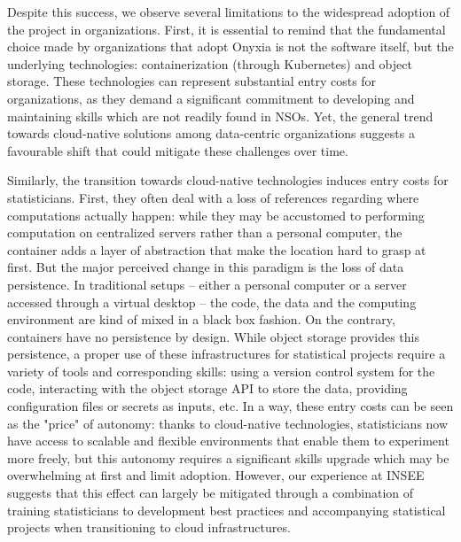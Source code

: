 \documentclass[graybox]{svmult}
\begin{document}
Despite this success, we observe several limitations to the widespread adoption of the project in organizations. First, it is essential to remind that the fundamental choice made by organizations that adopt Onyxia is not the software itself, but the underlying technologies: containerization (through Kubernetes) and object storage. These technologies can represent substantial entry costs for organizations, as they demand a significant commitment to developing and maintaining skills which are not readily found in NSOs. Yet, the general trend towards cloud-native solutions among data-centric organizations suggests a favourable shift that could mitigate these challenges over time.

Similarly, the transition towards cloud-native technologies induces entry costs for statisticians. First, they often deal with a loss of references regarding where computations actually happen: while they may be accustomed to performing computation on centralized servers rather than a personal computer, the container adds a layer of abstraction that make the location hard to grasp at first. But the major perceived change in this paradigm is the loss of data persistence. In traditional setups -- either a personal computer or a server accessed through a virtual desktop -- the code, the data and the computing environment are kind of mixed in a black box fashion. On the contrary, containers have no persistence by design. While object storage provides this persistence, a proper use of these infrastructures for statistical projects require a variety of tools and corresponding skills: using a version control system for the code, interacting with the object storage API to store the data, providing configuration files or secrets as inputs, etc. In a way, these entry costs can be seen as the "price" of autonomy: thanks to cloud-native technologies, statisticians now have access to scalable and flexible environments that enable them to experiment more freely, but this autonomy requires a significant skills upgrade which may be overwhelming at first and limit adoption. However, our experience at INSEE suggests that this effect can largely be mitigated through a combination of training statisticians to development best practices and accompanying statistical projects when transitioning to cloud infrastructures.
\end{document}
